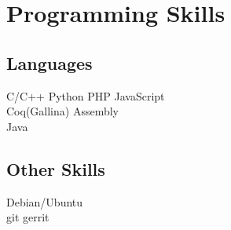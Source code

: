 \documentclass[]{deedy-resume-openfont}
\begin{document}
\section{Programming Skills}
\begin{minipage}[t]{.6\textwidth}
\subsection{Languages}
C/C++ \textbullet{} Python \textbullet{} PHP \textbullet{} JavaScript \\
Coq(Gallina) \textbullet{} Assembly \textbullet{} \\
Java

\sectionsep
\end{minipage}
\hfill
\begin{minipage}[t]{.35\textwidth}
\subsection{Other Skills}
Debian/Ubuntu\\
git \textbullet{} gerrit\\
\end{minipage}

\end{document}

